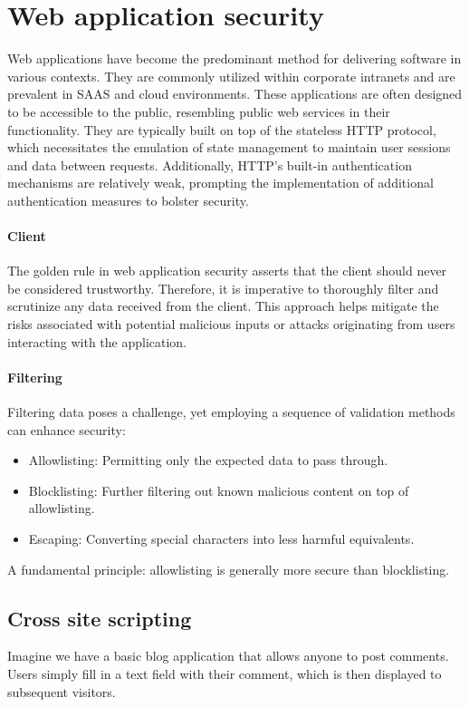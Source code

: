 \section{Web application security}

Web applications have become the predominant method for delivering software in various contexts. 
They are commonly utilized within corporate intranets and are prevalent in SAAS and cloud environments. 
These applications are often designed to be accessible to the public, resembling public web services in their functionality.
They are typically built on top of the stateless HTTP protocol, which necessitates the emulation of state management to maintain user sessions and data between requests.
Additionally, HTTP's built-in authentication mechanisms are relatively weak, prompting the implementation of additional authentication measures to bolster security.

\paragraph*{Client}
The golden rule in web application security asserts that the client should never be considered trustworthy. 
Therefore, it is imperative to thoroughly filter and scrutinize any data received from the client. 
This approach helps mitigate the risks associated with potential malicious inputs or attacks originating from users interacting with the application.

\paragraph*{Filtering}
Filtering data poses a challenge, yet employing a sequence of validation methods can enhance security:
\begin{itemize}
    \item Allowlisting: Permitting only the expected data to pass through.
    \item Blocklisting: Further filtering out known malicious content on top of allowlisting.
    \item Escaping: Converting special characters into less harmful equivalents.
\end{itemize}
A fundamental principle: allowlisting is generally more secure than blocklisting.

\subsection{Cross site scripting}
Imagine we have a basic blog application that allows anyone to post comments. 
Users simply fill in a text field with their comment, which is then displayed to subsequent visitors.

